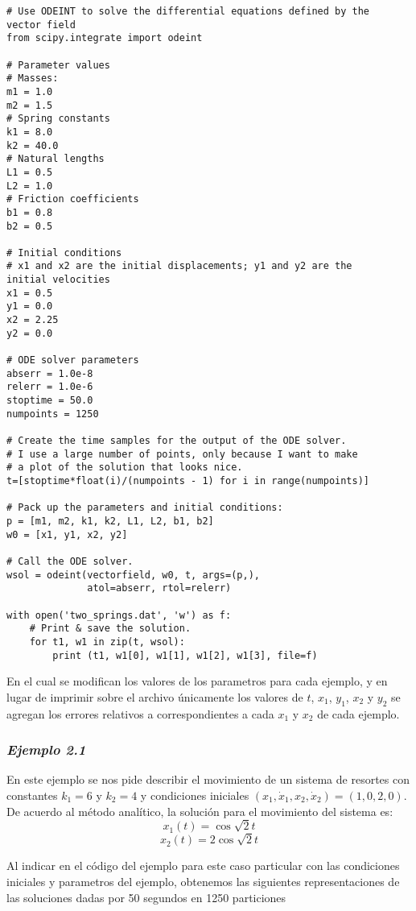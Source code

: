 \documentclass{article}
\begin{document}
\begin{framed}
\begin{verbatim}
# Use ODEINT to solve the differential equations defined by the
vector field
from scipy.integrate import odeint

# Parameter values
# Masses:
m1 = 1.0
m2 = 1.5
# Spring constants
k1 = 8.0
k2 = 40.0
# Natural lengths
L1 = 0.5
L2 = 1.0
# Friction coefficients
b1 = 0.8
b2 = 0.5

# Initial conditions
# x1 and x2 are the initial displacements; y1 and y2 are the 
initial velocities
x1 = 0.5
y1 = 0.0
x2 = 2.25
y2 = 0.0

# ODE solver parameters
abserr = 1.0e-8
relerr = 1.0e-6
stoptime = 50.0
numpoints = 1250

# Create the time samples for the output of the ODE solver.
# I use a large number of points, only because I want to make
# a plot of the solution that looks nice.
t=[stoptime*float(i)/(numpoints - 1) for i in range(numpoints)]

# Pack up the parameters and initial conditions:
p = [m1, m2, k1, k2, L1, L2, b1, b2]
w0 = [x1, y1, x2, y2]

# Call the ODE solver.
wsol = odeint(vectorfield, w0, t, args=(p,),
              atol=abserr, rtol=relerr)

with open('two_springs.dat', 'w') as f:
    # Print & save the solution.
    for t1, w1 in zip(t, wsol):
        print (t1, w1[0], w1[1], w1[2], w1[3], file=f)
\end{verbatim}
\end{framed}

En el cual se modifican los valores de los parametros para cada ejemplo, y en lugar de imprimir sobre el archivo únicamente los valores de $t$, $x_1$, $y_1$, $x_2$ y $y_2$ se agregan los errores relativos a correspondientes a cada $x_1$ y $x_2$ de cada ejemplo.

\subsubsection*{\textit{Ejemplo 2.1}}

En este ejemplo se nos pide describir el movimiento de un sistema de resortes con constantes $k_1=6$ y $k_2=4$ y condiciones iniciales $(x_1,\dot{x}_1,x_2,\dot{x}_2)=(1,0,2,0)$. De acuerdo al método analítico, la solución para el movimiento del sistema es:
\[ x_1(t)=\cos\sqrt{2}t \]
\[ x_2(t)=2\cos\sqrt{2}t \]

Al indicar en el código del ejemplo para este caso particular con las condiciones iniciales y parametros del ejemplo, obtenemos las siguientes representaciones de las soluciones dadas por 50 segundos en 1250 particiones
\end{document}
